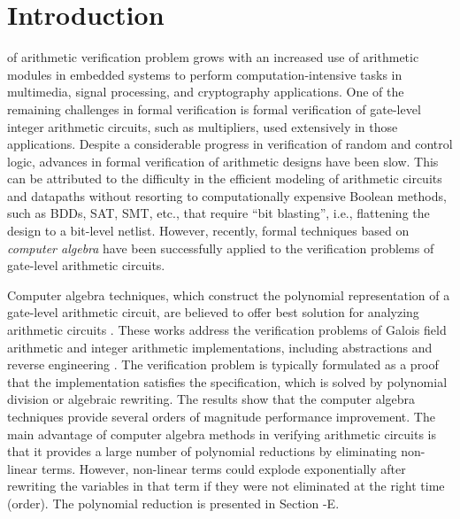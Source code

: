 \section{Introduction}

 of arithmetic verification problem grows with an increased use of arithmetic modules in embedded systems to perform computation-intensive tasks in multimedia, signal processing, and cryptography applications. 
One of the remaining challenges in formal verification is formal verification of gate-level integer arithmetic circuits, such as multipliers, used extensively in those applications. Despite a considerable progress in verification of random and control logic, advances in formal verification of arithmetic designs have been slow. This can be attributed to the difficulty in the efficient modeling of arithmetic circuits and datapaths without resorting to computationally expensive Boolean methods, such as BDDs, SAT, SMT, etc., that require ``bit blasting'', i.e., flattening the design to a bit-level netlist. However, recently, formal techniques based on \textit{computer algebra} have been successfully applied to the verification problems of gate-level arithmetic circuits.

Computer algebra techniques, which construct the polynomial representation of a gate-level arithmetic circuit, are believed to offer best solution for analyzing arithmetic circuits \cite{ciesielski2015verification}\cite{kalla:tcad13}\cite{STABLE:date11}\cite{farahmandi2015groebner}\cite{sayedformal:date-2016}. These works address the verification problems of Galois field arithmetic \cite{kalla:tcad13} and integer arithmetic implementations, including abstractions and reverse engineering \cite{STABLE:date11}\cite{farahmandi2015groebner}\cite{sayedformal:date-2016}\cite{ciesielski2015verification}. The verification problem is typically formulated as a proof that the implementation satisfies the specification, which is solved by polynomial division or algebraic rewriting. The results show that the computer algebra techniques provide several orders of magnitude performance improvement. The main advantage of computer algebra methods in verifying arithmetic circuits is that it provides a large number of polynomial reductions by eliminating non-linear terms. {\color{red} However, non-linear terms could explode exponentially after rewriting the variables in that term if they were not eliminated at the right time (order). The polynomial reduction is presented in Section -E.} %

